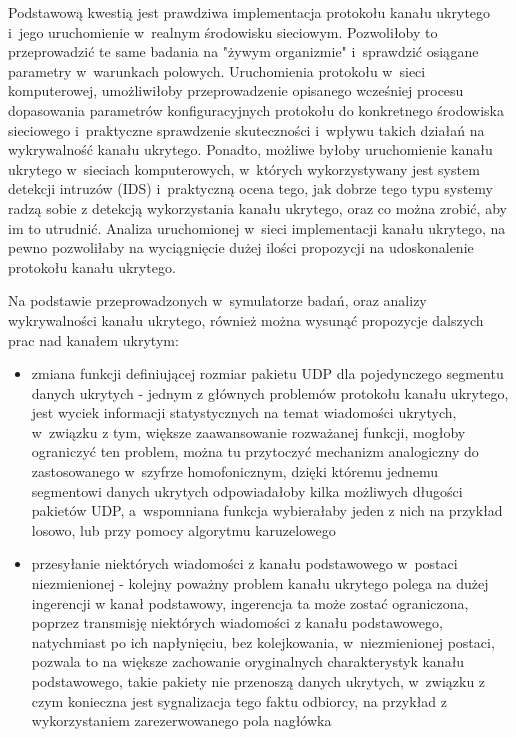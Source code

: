 \documentclass[a4paper, twoside, 12pt]{report}
\begin{document}
    Podstawową kwestią jest prawdziwa implementacja protokołu kanału ukrytego
    i~jego uruchomienie w~realnym środowisku sieciowym. Pozwoliłoby to przeprowadzić
    te same badania na "żywym organizmie" i~sprawdzić osiągane parametry w~warunkach polowych.
    Uruchomienia protokołu w~sieci komputerowej, umożliwiłoby przeprowadzenie opisanego
    wcześniej procesu dopasowania parametrów konfiguracyjnych protokołu do konkretnego
    środowiska sieciowego i~praktyczne sprawdzenie skuteczności i~wpływu takich
    działań na wykrywalność kanału ukrytego. Ponadto, możliwe byłoby uruchomienie
    kanału ukrytego w~sieciach komputerowych, w~których wykorzystywany jest system
    detekcji intruzów (IDS) i~praktyczną ocena tego, jak dobrze tego typu systemy
    radzą sobie z detekcją wykorzystania kanału ukrytego, oraz co można zrobić,
    aby im to utrudnić. Analiza uruchomionej w~sieci implementacji kanału ukrytego,
    na pewno pozwoliłaby na wyciągnięcie dużej ilości propozycji na udoskonalenie
    protokołu kanału ukrytego.

    Na podstawie przeprowadzonych w~symulatorze badań, oraz analizy wykrywalności
    kanału ukrytego, również można wysunąć propozycje dalszych prac nad kanałem ukrytym:

    \begin{itemize}
        \item zmiana funkcji definiującej rozmiar pakietu UDP dla pojedynczego segmentu danych ukrytych -
            jednym z głównych problemów protokołu kanału ukrytego, jest wyciek
            informacji statystycznych na temat wiadomości ukrytych, w~związku z tym,
            większe zaawansowanie rozważanej funkcji, mogłoby ograniczyć ten problem,
            można tu przytoczyć mechanizm analogiczny do zastosowanego w~szyfrze
            homofonicznym, dzięki któremu jednemu segmentowi danych ukrytych
            odpowiadałoby kilka możliwych długości pakietów UDP, a~wspomniana funkcja
            wybierałaby jeden z nich na przykład losowo, lub przy pomocy algorytmu
            karuzelowego
        \item przesyłanie niektórych wiadomości z kanału podstawowego w~postaci niezmienionej -
            kolejny poważny problem kanału ukrytego polega na dużej ingerencji w
            kanał podstawowy, ingerencja ta może zostać ograniczona, poprzez
            transmisję niektórych wiadomości z kanału podstawowego, natychmiast
            po ich napłynięciu, bez kolejkowania, w~niezmienionej postaci,
            pozwala to na większe zachowanie oryginalnych charakterystyk kanału
            podstawowego, takie pakiety nie przenoszą danych ukrytych, w~związku
            z czym konieczna jest sygnalizacja tego faktu odbiorcy, na przykład
            z wykorzystaniem zarezerwowanego pola nagłówka
    \end{itemize}

\clearpage
{}


\end{document}
